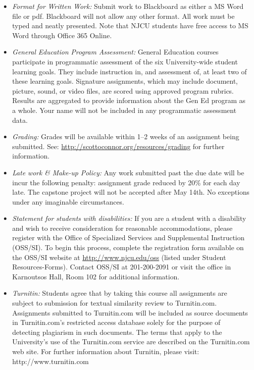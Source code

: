 \documentclass[article,oneside]{memoir}
\begin{document}
\begin{itemize}
\item \textit{Format for Written Work:} Submit work to Blackboard as either a MS Word file or pdf. Blackboard will not allow any other format. All work must be typed and neatly presented. Note that NJCU students have free access to MS Word through Office 365 Online.


\item \textit{General Education Program Assessment:} General Education courses participate in programmatic assessment of the six University-wide student learning goals. They include instruction in, and assessment of, at least two of these learning goals. Signature assignments, which may include document, picture, sound, or video files, are scored using approved program rubrics. Results are aggregated to provide information about the Gen Ed program as a whole. Your name will not be included in any programmatic assessment data.

\item \textit{Grading:} Grades will be available within 1--2 weeks of an assignment being submitted. See: \href{http://scottoconnor.org/resources/grading}{http://scottoconnor.org/resources/grading} for further information.


\item \textit{Late work \& Make-up Policy:} Any work submitted past the due date will be incur the following penalty: assignment grade reduced by 20\% for each day late. The capstone project will not be accepted after May 14th.  No exceptions under any imaginable circumstances.

\item \textit{Statement for students with disabilities:} If you are a student
with a disability and wish to receive consideration for reasonable
accommodations, please register with the Office of Specialized Services
and Supplemental Instruction (OSS/SI). To begin this process, complete
the registration form available on the OSS/SI website at
\href{http://www.njcu.edu/oss}{http://www.njcu.edu/oss}
(listed under Student Resources-Forms). Contact OSS/SI at 201-200-2091
or visit the office in Karnoutsos Hall, Room 102 for additional
information.

\item \textit{Turnitin:} Students agree that by taking this course all assignments are subject to submission for textual similarity review to Turnitin.com. Assignments submitted to Turnitin.com will be included as source documents in Turnitin.com's restricted access database solely for the purpose of detecting plagiarism in such documents.  The terms that apply to the University’s use of the Turnitin.com service are described on the Turnitin.com web site.  For further information about Turnitin, please visit: http://www.turnitin.com 


\end{itemize}
\end{document}
